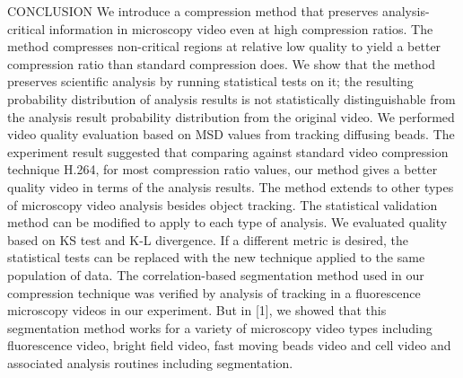 CONCLUSION
We introduce a compression method that preserves analysis-critical information in microscopy video even at high compression ratios. The method compresses non-critical regions at relative low quality to yield a better compression ratio than standard compression does. We show that the method preserves scientific analysis by running statistical tests on it; the resulting probability distribution of analysis results is not statistically distinguishable from the analysis result probability distribution from the original video.
We performed video quality evaluation based on MSD values from tracking diffusing beads. The experiment result suggested that comparing against standard video compression technique H.264, for most compression ratio values, our method gives a better quality video in terms of the analysis results.
The method extends to other types of microscopy video analysis besides object tracking. The statistical validation method can be modified to apply to each type of analysis. We evaluated quality based on KS test and K-L divergence. If a different metric is desired, the statistical tests can be replaced with the new technique applied to the same population of data.
The correlation-based segmentation method used in our compression technique was verified by analysis of tracking in a fluorescence microscopy videos in our experiment. But in [1], we showed that this segmentation method works for a variety of microscopy video types including fluorescence video, bright field video, fast moving beads video and cell video and associated analysis routines including segmentation.
